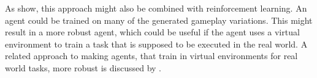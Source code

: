 As \cite{Ha2018-dd} show, this approach might also be combined with reinforcement learning. An agent could be trained on many of the generated gameplay variations. This might result in a more robust agent, which could be useful if the agent uses a virtual environment to train a task that is supposed to be executed in the real world. A related approach to making agents, that train in virtual environments for real world tasks, more robust is discussed by \cite{Peng2017-wx}.


%
%
